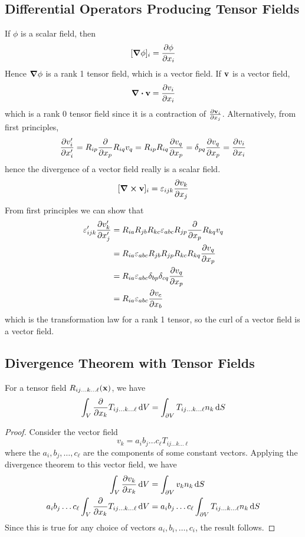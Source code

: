 \subsection{Differential Operators Producing Tensor Fields}
If $\phi$ is a scalar field, then
\[ [\grad\phi]_i = \pdv{\phi}{x_i} \]
Hence $\grad\phi$ is a rank 1 tensor field, which is a vector field. If $\vb v$ is a vector field,
\[ \div \vb v = \pdv{v_i}{x_i} \]
which is a rank 0 tensor field since it is a contraction of $\pdv{\vb v_i}{x_j}$. Alternatively, from first principles,
\[ \pdv{v_i'}{x_i'} = R_{ip}\pdv{x_p}R_{iq}v_q = R_{ip}R_{iq}\pdv{v_q}{x_p} = \delta_{pq}\pdv{v_q}{x_p} = \pdv{v_i}{x_i} \]
hence the divergence of a vector field really is a scalar field.
\[ [\curl \vb v]_i = \varepsilon_{ijk} \pdv{v_k}{x_j} \]
From first principles we can show that
\begin{align*}
	\varepsilon_{ijk}' \pdv{v_k'}{x_j'} & = R_{ia}R_{jb}R_{kc}\varepsilon_{abc} R_{jp}\pdv{x_p} R_{kq}v_q       \\
	                                    & = R_{ia} \varepsilon_{abc} R_{jb} R_{jp} R_{kc} R_{kq} \pdv{v_q}{x_p} \\
	                                    & = R_{ia} \varepsilon_{abc} \delta_{bp} \delta_{cq} \pdv{v_q}{x_p}     \\
	                                    & = R_{ia} \varepsilon_{abc} \pdv{v_c}{x_b}
\end{align*}
which is the transformation law for a rank 1 tensor, so the curl of a vector field is a vector field.

\subsection{Divergence Theorem with Tensor Fields}
\begin{proposition}
	For a tensor field $R_{ij\dots k \dots \ell}(\vb x)$, we have
	\[ \int_V \pdv{x_k} T_{ij\dots k \dots \ell} \dd{V} = \int_{\partial V} T_{ij\dots k \dots \ell} n_k \dd{S} \]
\end{proposition}
\begin{proof}
	Consider the vector field
	\[ v_k = a_i b_j \dots c_\ell T_{ij\dots k \dots \ell} \]
	where the $a_i, b_j, \dots, c_\ell$ are the components of some constant vectors. Applying the divergence theorem to this vector field, we have
	\begin{align*}
		\int_V \pdv{v_k}{x_k} \dd{V}                                         & = \int_{\partial V} v_k n_k \dd{S}                                          \\
		a_i b_j \dots c_\ell \int_V \pdv{x_k} T_{ij\dots k\dots \ell} \dd{V} & = a_i b_j \dots c_\ell \int_{\partial V} T_{ij\dots k\dots \ell} n_k \dd{S}
	\end{align*}
	Since this is true for any choice of vectors $a_i, b_i, \dots, c_i$, the result follows.
\end{proof}
